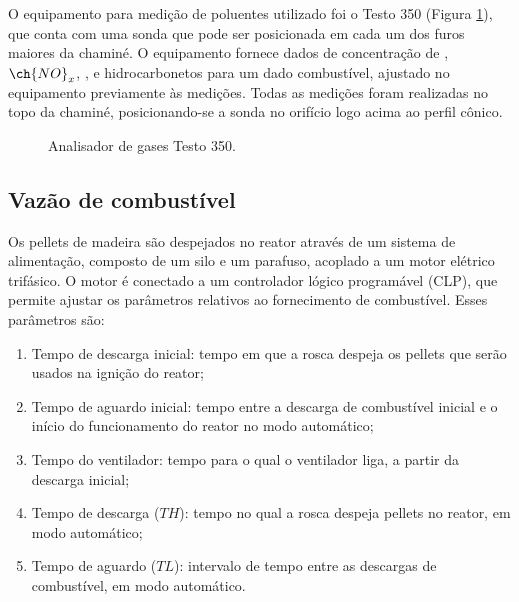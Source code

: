 O equipamento para medição de poluentes utilizado foi o Testo 350 (Figura \ref{fig:testo}), que conta com uma sonda que pode ser posicionada em cada um dos furos maiores da chaminé. O equipamento fornece dados de concentração de , $\ch{NO}_x$, ,  e hidrocarbonetos para um dado combustível, ajustado no equipamento previamente às medições. Todas as medições foram realizadas no topo da chaminé, posicionando-se a sonda no orifício logo acima ao perfil cônico.

\begin{figure}
	\centering
	\caption{Analisador de gases Testo 350.}
	\label{fig:testo}
\end{figure}

\subsection{Vazão de combustível}
Os pellets de madeira são despejados no reator através de um sistema de alimentação, composto de um silo e um parafuso, acoplado a um motor elétrico trifásico. O motor é conectado a um controlador lógico programável (CLP), que permite ajustar os parâmetros relativos ao fornecimento de combustível. Esses parâmetros são:

\begin{enumerate}[noitemsep,nosep,labelindent=\parindent,leftmargin=*,label={\alph*})] 
	\item Tempo de descarga inicial: tempo em que a rosca despeja os pellets que serão usados na ignição do reator;
	\item Tempo de aguardo inicial: tempo entre a descarga de combustível inicial e o início do funcionamento do reator no modo automático;
	\item Tempo do ventilador: tempo para o qual o ventilador liga, a partir da descarga inicial;
	\item Tempo de descarga ($TH$): tempo no qual a rosca despeja pellets no reator, em modo automático;
	\item Tempo de aguardo ($TL$): intervalo de tempo entre as descargas de combustível, em modo automático.
\end{enumerate}

